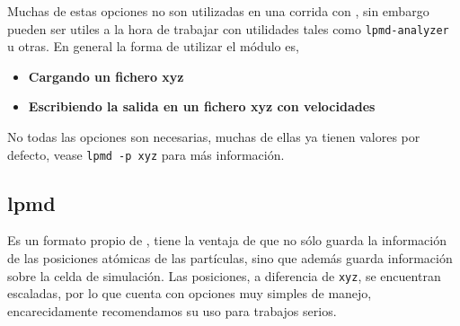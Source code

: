 
Muchas de estas opciones no son utilizadas en una corrida con \lpmd, sin embargo pueden ser utiles a la hora de trabajar con utilidades tales como \verb|lpmd-analyzer| u otras. En general la forma de utilizar el m\'odulo es,

\begin{itemize}
 \item \textbf{Cargando un fichero xyz}
 \item \textbf{Escribiendo la salida en un fichero xyz con velocidades}
\end{itemize}

No todas las opciones son necesarias, muchas de ellas ya tienen valores por defecto, vease \verb|lpmd -p xyz| para m\'as informaci\'on.

\subsection{lpmd}

Es un formato propio de \lpmd, tiene la ventaja de que no s\'olo guarda la informaci\'on de las posiciones at\'omicas de las part\'iculas, sino que adem\'as guarda informaci\'on sobre la celda de simulaci\'on. Las posiciones, a diferencia de \verb|xyz|, se encuentran escaladas, por lo que cuenta con opciones muy simples de manejo, encarecidamente recomendamos su uso para trabajos serios.

